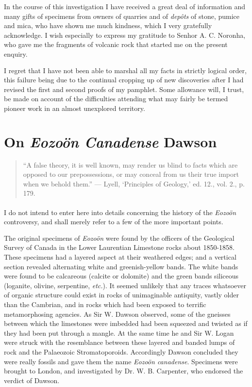 \documentclass[a4paper, 12pt, oneside]{article}
\begin{document}
In the course of this investigation I have received a great deal of information and many gifts of specimens from owners of quarries and of \emph{depôts} of stone, pumice and mica, who have shown me much kindness, which I very gratefully acknowledge. I wish especially to express my gratitude to Senhor A. C. Noronha, who gave me the fragments of volcanic rock that started me on the present enquiry.

I regret that I have not been able to marshal all my facts in strictly logical order, this failure being due to the continual cropping up of new discoveries after I had revised the first and second proofs of my pamphlet. Some allowance will, I trust, be made on account of the difficulties attending what may fairly be termed pioneer work in an almost unexplored territory.
\clearpage
\section{On \emph{Eozoön Canadense} Dawson}
\begin{quote} 
``A false theory, it is well known, may render us blind to facts which are opposed to our prepossessions, or may conceal from us their true import when we behold them.'' --- Lyell, `Principles of Geology,' ed. 12., vol. 2., p. 179.
\end{quote}
\paragraph{}
I do not intend to enter here into details concerning the history of the \emph{Eozoön} controversy, and shall merely refer to a few of the more important points.

The original specimens of \emph{Eozoön} were found by the officers of the Geological Survey of Canada in the Lower Laurentian Limestone rocks about 1850-1858. These specimens had a layered aspect at their weathered edges; and a vertical section revealed alternating white and greenish-yellow bands. The white bands were found to be calcareous (calcite or dolomite) and the green bands siliceous (loganite, olivine, serpentine, \emph{etc.}). It seemed unlikely that any traces whatsoever of organic structure could exist in rocks of unimaginable antiquity, vastly older than the Cambrian, and in rocks which had been exposed to terrific metamorphosing agencies. As Sir W. Dawson observed, some of the gneisses between which the limestones were imbedded had been squeezed and twisted as if they had been put through a mangle. At the same time he and Sir W. Logan were struck with the resemblance between these layered and banded lumps of rock and the Palaeozoic Stromatoporoids. Accordingly Dawson concluded they were really fossils and gave them the name \emph{Eozoön canadense}. Specimens were brought to London, and investigated by Dr. W. B. Carpenter, who endorsed the verdict of Dawson.
\end{document}
